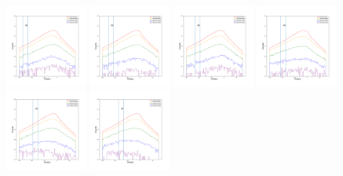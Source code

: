 \documentclass[12pt,prd]{article}
\begin{document}
\begin{figure}[h!]
\centering
\includegraphics[width=0.24\textwidth]{../figures/scanning_plotsgaiascan_l67_5_b74_4_ra208_6_dec35_1_npy_0.pdf}
\includegraphics[width=0.24\textwidth]{../figures/scanning_plotsgaiascan_l67_5_b74_4_ra208_6_dec35_1_npy_1.pdf}
\includegraphics[width=0.24\textwidth]{../figures/scanning_plotsgaiascan_l67_5_b74_4_ra208_6_dec35_1_npy_2.pdf}
\includegraphics[width=0.24\textwidth]{../figures/scanning_plotsgaiascan_l67_5_b74_4_ra208_6_dec35_1_npy_3.pdf}
\includegraphics[width=0.24\textwidth]{../figures/scanning_plotsgaiascan_l67_5_b74_4_ra208_6_dec35_1_npy_4.pdf}
\includegraphics[width=0.24\textwidth]{../figures/scanning_plotsgaiascan_l67_5_b74_4_ra208_6_dec35_1_npy_5.pdf}

\end{figure}
\end{document}
